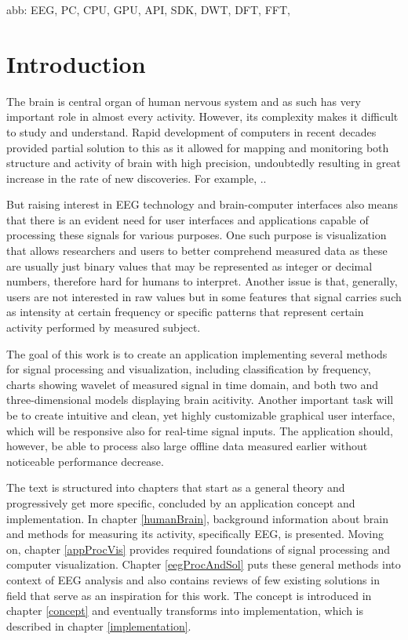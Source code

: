 abb:
EEG,
PC,
CPU,
GPU,
API,
SDK,
DWT,
DFT,
FFT,

\chapter{Introduction}
The brain is central organ of human nervous system and as such has very
important role in almost every activity. However, its complexity makes it
difficult to study and understand. Rapid development of computers in recent
decades provided partial solution to this as it allowed for mapping and
monitoring both structure and activity of brain with high precision,
undoubtedly resulting in great increase in the rate of new discoveries. For
example, ..

But raising interest in EEG technology and brain-computer interfaces also means
that there is an evident need for user interfaces and applications capable of
processing these signals for various purposes. One such purpose is visualization
that allows researchers and users to better comprehend measured data as these
are usually just binary values that may be represented as integer or decimal
numbers, therefore hard for humans to interpret. Another issue is that,
generally, users are not interested in raw values but in some features that
signal carries such as intensity at certain frequency or specific patterns that
represent certain activity performed by measured subject.

The goal of this work is to create an application implementing several
methods for signal processing and visualization, including classification by
frequency, charts showing wavelet of measured signal in time domain, and both
two and three-dimensional models displaying brain acitivity. Another important
task will be to create intuitive and clean, yet highly customizable graphical
user interface, which will be responsive also for real-time signal inputs. The
application should, however, be able to process also large offline data measured
earlier without noticeable performance decrease.

The text is structured into chapters that start as a general theory and
progressively get more specific, concluded by an application concept and
implementation. In chapter \ref{humanBrain}, background information about brain
and methods for measuring its activity, specifically EEG, is presented. Moving
on, chapter \ref{appProcVis} provides required foundations of signal processing
and computer visualization. Chapter \ref{eegProcAndSol} puts these general
methods into context of EEG analysis and also contains reviews of few existing
solutions in field that serve as an inspiration for this work. The concept is
introduced in chapter \ref{concept} and eventually transforms into
implementation, which is described in chapter \ref{implementation}.
 
